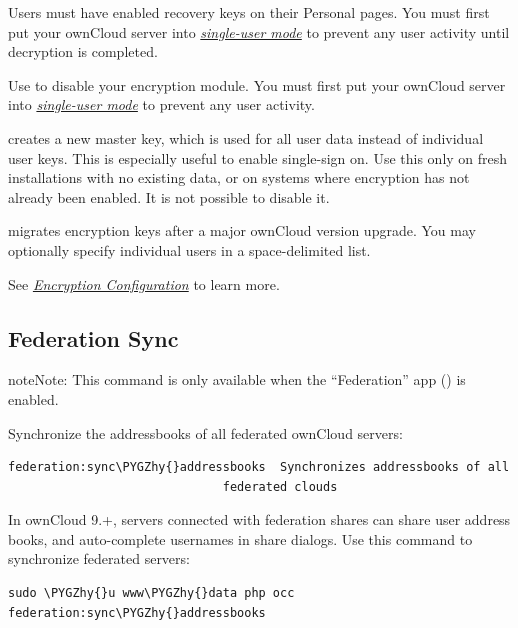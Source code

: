 \documentclass[letterpaper,10pt,english]{sphinxmanual}
\def\PYGZhy{\char`\-}
\begin{document}
Users must have enabled recovery keys on their Personal pages. You must first
put your ownCloud server into {\hyperref[configuration_server/occ_command:maintenance-commands-label]{\emph{single-user
mode}}} to prevent any user activity until
decryption is completed.

Use  to disable your encryption module. You must first put
your ownCloud server into {\hyperref[configuration_server/occ_command:maintenance-commands-label]{\emph{single-user mode}}}
to prevent any user activity.

 creates a new master key, which is used for all
user data instead of individual user keys. This is especially useful to enable
single-sign on. Use this only on fresh installations with no existing data, or
on systems where encryption has not already been enabled. It is not possible to
disable it.

 migrates encryption keys after a major ownCloud version
upgrade. You may optionally specify individual users in a space-delimited list.

See {\hyperref[configuration_files/encryption_configuration::doc]{\emph{Encryption Configuration}}} to learn more.


\subsection{Federation Sync}
\label{configuration_server/occ_command:federation-sync-label}\label{configuration_server/occ_command:federation-sync}
\begin{notice}{note}{Note:}
This command is only available when the ``Federation'' app () is
enabled.
\end{notice}

Synchronize the addressbooks of all federated ownCloud servers:

\begin{Verbatim}[commandchars=\\\{\}]
federation:sync\PYGZhy{}addressbooks  Synchronizes addressbooks of all
                              federated clouds
\end{Verbatim}

In ownCloud 9.+, servers connected with federation shares can share user
address books, and auto-complete usernames in share dialogs. Use this command
to synchronize federated servers:

\begin{Verbatim}[commandchars=\\\{\}]
sudo \PYGZhy{}u www\PYGZhy{}data php occ federation:sync\PYGZhy{}addressbooks
\end{Verbatim}
\end{document}

